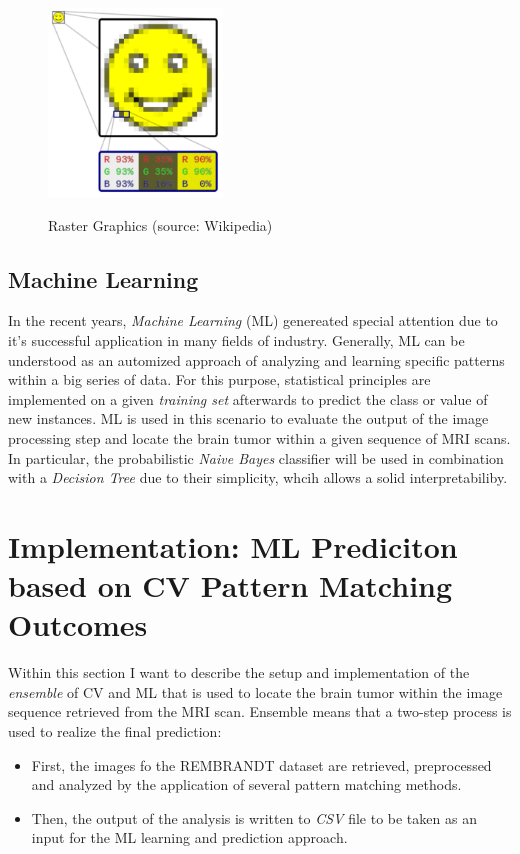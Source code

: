 \documentclass[twoside,11pt]{article}
\begin{document}
\begin{figure}{\textwidth}
	\label{fig:pixel}
	\centering
	\includegraphics[height=5cm]{pixel}
	\caption{Raster Graphics (source: Wikipedia)}
\end{figure}%

\subsection{Machine Learning}
In the recent years, \textit{Machine Learning} (ML) genereated special attention due to it's successful application in many fields of industry. Generally, ML can be understood as an automized approach of analyzing and learning specific patterns within a big series of data. For this purpose, statistical principles are implemented on a given \textit{training set} afterwards to predict the class or value of new instances. ML is used in this scenario to evaluate the output of the image processing step and locate the brain tumor within a given sequence of MRI scans. In particular, the probabilistic \textit{Naive Bayes} classifier will be used in combination with a \textit{Decision Tree} due to their simplicity, whcih allows a solid interpretabiliby.

\section{Implementation: ML Prediciton based on CV Pattern Matching Outcomes}
Within this section I want to describe the setup and implementation of the \textit{ensemble} of CV and ML that is used to locate the brain tumor within the image sequence retrieved from the MRI scan. Ensemble means that a two-step process is used to realize the final prediction:
\begin{itemize}
	\item First, the images fo the REMBRANDT dataset are retrieved, preprocessed and analyzed by the application of several pattern matching methods.
	\item Then, the output of the analysis is written to \textit{CSV} file to be taken as an input for the ML learning and prediction approach.
\end{itemize}
\end{document}
